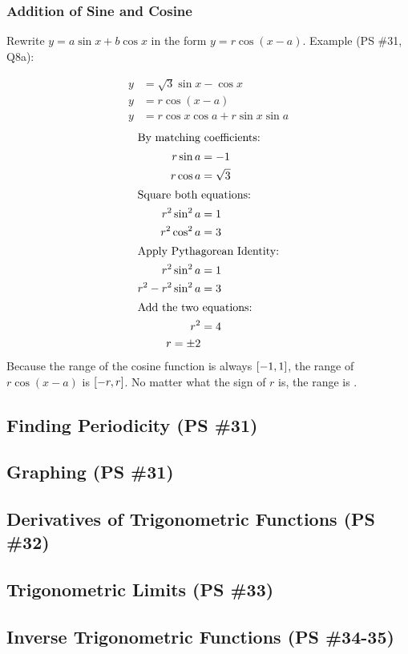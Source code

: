 \documentclass{article}
\begin{document}
\subsubsection{Addition of Sine and Cosine}
Rewrite $y=a\sin x+b\cos x$ in the form $y=r\cos\left(x-a\right)$. Example (PS \#31, Q8a):
\begin{multicols}{2}
\begin{align*}
	y&=\sqrt{3}\sin x-\cos x \\
	y&=r\cos\left(x-a\right) \\
	y&=r\cos x\cos a+r\sin x\sin a
\end{align*}
\begin{align*}
	\intertext{By matching coefficients:}
	r\sin a&=-1 \\
	r\cos a&=\sqrt{3} \\
	\intertext{Square both equations:}
	r^2\sin^2a&=1 \\
	r^2\cos^2a&=3 \\
	\intertext{Apply Pythagorean Identity:}
	r^2\sin^2a&=1 \\
	r^2-r^2\sin^2a&=3 \\
	\intertext{Add the two equations:}
	r^2&=4 \\
	r=\pm2
\end{align*}
Because the range of the cosine function is always
$\interval[scaled]{-1}{1}$, the range of $r\cos\left(x-a\right)$
is $\interval[scaled]{-r}{r}$. No matter what the sign of $r$ is,
the range is .

\end{multicols}

\subsection{Finding Periodicity (PS \#31)}
\subsection{Graphing (PS \#31)}

\subsection{Derivatives of Trigonometric Functions (PS \#32)}
\subsection{Trigonometric Limits (PS \#33)}
\subsection{Inverse Trigonometric Functions (PS \#34-35)}
\end{document}
